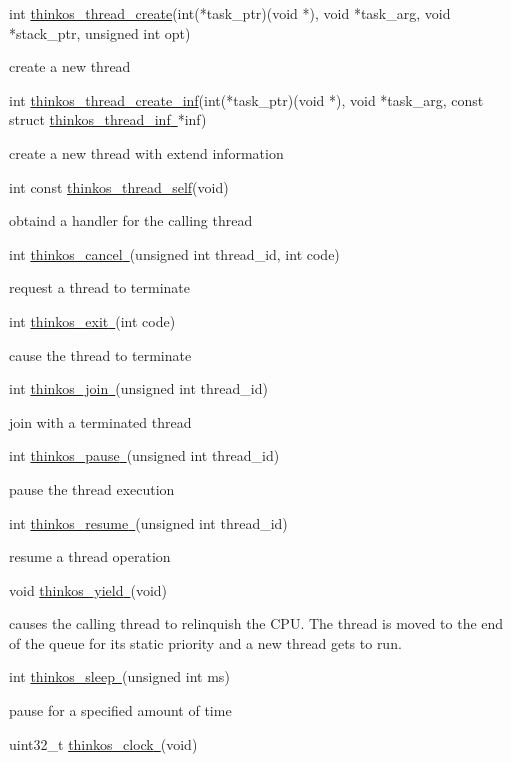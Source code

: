 {{int
}{\protect\hyperlink{h.1fob9te}{thinkos\_thread\_create}}{(int(*task\_ptr)(void
*), void *task\_arg, void *stack\_ptr, unsigned int opt)}

{create a new thread }

{int
}{\protect\hyperlink{h.3znysh7}{thinkos\_thread\_create\_inf}}{(int(*task\_ptr)(void
*), void *task\_arg, const struct
}{\protect\hyperlink{h.2iq8gzs}{thinkos\_thread\_inf}}{\protect\hyperlink{h.2iq8gzs}{~}}{*inf)}

{create a new thread with extend information }

{int const
}{\protect\hyperlink{h.2et92p0}{thinkos\_thread\_self}}{(void)}

{obtaind a handler for the calling thread }

{int
}{\protect\hyperlink{h.tyjcwt}{thinkos\_cancel}}{\protect\hyperlink{h.tyjcwt}{~}}{(unsigned
int thread\_id, int code)}

{request a thread to terminate }

{int
}{\protect\hyperlink{h.3dy6vkm}{thinkos\_exit}}{\protect\hyperlink{h.3dy6vkm}{~}}{(int
code)}

{cause the thread to terminate }

{int
}{\protect\hyperlink{h.1t3h5sf}{thinkos\_join}}{\protect\hyperlink{h.1t3h5sf}{~}}{(unsigned
int thread\_id)}

{join with a terminated thread }

{int
}{\protect\hyperlink{h.4d34og8}{thinkos\_pause}}{\protect\hyperlink{h.4d34og8}{~}}{(unsigned
int thread\_id)}

{pause the thread execution }

{int
}{\protect\hyperlink{h.2s8eyo1}{thinkos\_resume}}{\protect\hyperlink{h.2s8eyo1}{~}}{(unsigned
int thread\_id)}

{resume a thread operation }

{void
}{\protect\hyperlink{h.17dp8vu}{thinkos\_yield}}{\protect\hyperlink{h.17dp8vu}{~}}{(void)}

{causes the calling thread to relinquish the CPU. The thread is moved to
the end of the queue for its static priority and a new thread gets to
run. }

{int
}{\protect\hyperlink{h.26in1rg}{thinkos\_sleep}}{\protect\hyperlink{h.26in1rg}{~}}{(unsigned
int ms)}

{pause for a specified amount of time }

{uint32\_t
}{\protect\hyperlink{h.lnxbz9}{thinkos\_clock}}{\protect\hyperlink{h.lnxbz9}{~}}{(void)}

}
